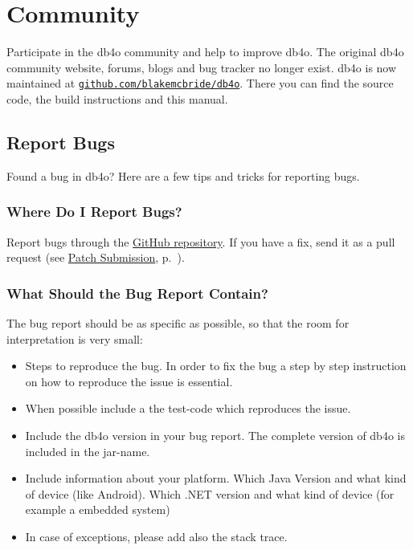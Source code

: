 
\chapter{Community}
\label{ref:community}

Participate in the db4o community and help to improve db4o. The original db4o community website, forums, blogs and bug tracker no longer exist. db4o is now maintained at \href{https://github.com/blakemcbride/db4o}{\nolinkurl{github.com/blakemcbride/db4o}}. There you can find the source code, the build instructions and this manual.

\section{Report Bugs}
\label{ref:community-report-bugs}

Found a bug in db4o? Here are a few tips and tricks for reporting bugs.

\subsection*{Where Do I Report Bugs?}

Report bugs through the \href{https://github.com/blakemcbride/db4o}{GitHub repository}. If you have a fix, send it as a pull request (see \hyperref[ref:community-working-with-source-patch-submission]{Patch Submission}, p.~\pageref{ref:community-working-with-source-patch-submission}).

\subsection*{What Should the Bug Report Contain?}

The bug report should be as specific as possible, so that the room for interpretation is very small:

\begin{itemize}
\item Steps to reproduce the bug. In order to fix the bug a step by step instruction on how to reproduce the issue is essential.
\item When possible include a the test-code which reproduces the issue.
\item Include the db4o version in your bug report. The complete version of db4o is included in the jar-name.
\item Include information about your platform. Which Java Version and what kind of device (like Android).  Which .NET version and what kind of device (for example a embedded system)
\item In case of exceptions, please add also the stack trace.
\end{itemize}


